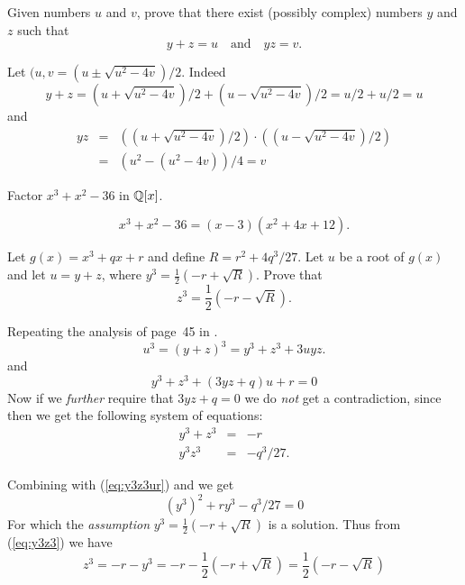 \begin{myenumerate}

\item
\begin{excopy}
Given numbers $u$ and $v$, prove that there exist (possibly complex)
numbers $y$ and $z$ such that
\[y+z=u \quad\textrm{and}\quad yz=v.\]
\end{excopy}

Let \((u,v=(u \pm \sqrt{u^2-4v})/2\). Indeed
\begin{equation*}
y+z = (u + \sqrt{u^2-4v})/2 + (u - \sqrt{u^2-4v})/2 = u/2+ u/2 = u
\end{equation*}
and
\begin{eqnarray*}
yz
 & = & \left(\left(u + \sqrt{u^2-4v}\right)/2\right) \cdot
       \left(\left(u - \sqrt{u^2-4v}\right)/2\right) \\
 & = & (u^2 - (u^2-4v))/4 = v
\end{eqnarray*}

\item
\begin{excopy}
Factor \(x^3+x^2-36\) in \(\mathbb{Q}[x]\).
\end{excopy}

\[x^3+x^2-36 = (x-3)(x^2+4x+12).\]

\item
\begin{excopy}
Let \(g(x)= x^3+qx+r\) and define \(R=r^2+4q^3/27\).
Let $u$ be a root of \(g(x)\) and let \(u=y+z\),
where \(y^3 = \frac{1}{2}\left(-r+\sqrt{R}\right)\).
Prove that
\[ z^3 = \frac{1}{2}\left(-r-\sqrt{R}\right).\]
\end{excopy}

Repeating the analysis of page~45 in \cite{Rotman98}.
\begin{equation*}
u^3 = (y+z)^3 = y^3+z^3+3uyz.
\end{equation*}
and
\begin{equation} \label{eq:y3z3ur}
y^3+z^3+(3yz+q)u+r = 0
\end{equation}
Now if we \emph{further} require that \(3yz+q=0\)
we do \emph{not} get a contradiction, since
then we get the following system of equations:
\begin{eqnarray}
y^3+z^3 & = & -r \label{eq:y3z3} \\
y^3z^3  & = & -q^3/27.
\end{eqnarray}

Combining with (\ref{eq:y3z3ur})
and we get
\begin{equation*}
(y^3)^2+ry^3-q^3/27 = 0
\end{equation*}
For which the \emph{assumption} \(y^3= \frac{1}{2}\left(-r+\sqrt{R}\right)\)
is a solution. Thus from (\ref{eq:y3z3})
we have
\begin{equation*}
z^3 = -r - y^3 =
  -r - \frac{1}{2}\left(-r+\sqrt{R}\right) =
  \frac{1}{2}\left(-r-\sqrt{R}\right)
\end{equation*}



\end{myenumerate}
